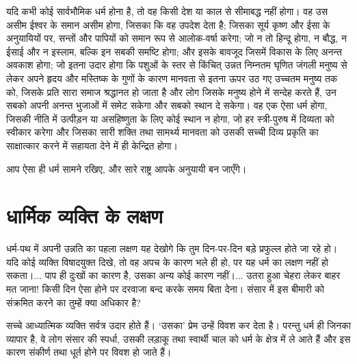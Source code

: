 \vskip 2pt

यदि कभी कोई सार्वभौमिक धर्म होना है, तो वह किसी देश या काल से सीमाबद्ध नहीं होगा। वह उस असीम ईश्वर के समान असीम होगा, जिसका कि वह उपदेश देता है; जिसका सूर्य कृष्ण और ईसा के अनुयायियों पर, सन्तों और पापियों को समान रूप से आलोक-वर्षा करेगा; जो न तो हिन्दू होगा, न बौद्ध, न ईसाई और न इस्लाम, बल्कि इन सबकी समष्टि होगा; और इसके बावजूद जिसमें विकास के लिए अनन्त अवकाश होगा; जो इतना उदार होगा कि पशुओं के स्तर से किंचित् उन्नत निम्नतम घृणित जंगली मनुष्य से लेकर अपने हृदय और मस्तिष्क के गुणों के कारण मानवता से इतना ऊपर उठ गए उच्चतम मनुष्य तक को, जिसके प्रति सारा समाज श्रद्धानत हो जाता है और लोग जिसके मनुष्य होने में सन्देह करते हैं, उन सबको अपनी अनन्त भुजाओं में समेट सकेगा और सबको स्थान दे सकेगा। वह एक ऐसा धर्म होगा, जिसकी नीति में उत्पीड़न या असहिष्णुता के लिए कोई स्थान न होगा, जो हर स्त्री-पुरुष में दिव्यता को स्वीकार करेगा और जिसका सारी शक्ति तथा सामर्थ्य मानवता को उसकी सच्ची दिव्य प्रकृति का साक्षात्कार करने में सहायता देने में ही केन्द्रित होगा। 

\vskip 2pt

आप ऐसा ही धर्म सामने रखिए, और सारे राष्ट्र आपके अनुयायी बन जाएँगे। 

\vskip 2pt


\section*{धार्मिक व्यक्ति के लक्षण}


धर्म-पथ में अपनी उन्नति का पहला लक्षण यह देखोगे कि तुम दिन-पर-दिन बड़े प्रफुल्ल होते जा रहे हो। यदि कोई व्यक्ति विषादयुक्त दिखे, तो वह अपच के कारण भले ही हो, पर यह धर्म का लक्षण नहीं हो सकता।... पाप ही दुःखों का कारण है, उसका अन्य कोई कारण नहीं।... उतरा हुआ चेहरा लेकर बाहर मत जाना! किसी दिन ऐसा होने पर दरवाजा बन्द करके समय बिता देना। संसार में इस बीमारी को संक्रमित करने का तुम्हें क्या अधिकार है? 

सच्चे आध्यात्मिक व्यक्ति सर्वत्र उदार होते हैं। ‘उसका’ प्रेम उन्हें विवश कर देता है। परन्तु धर्म ही जिनका व्यापार है, वे लोग संसार की स्पर्धा, उसकी लड़ाकू तथा स्वार्थी चाल को धर्म के क्षेत्र में ले आते हैं और इस कारण संकीर्ण तथा धूर्त होने पर विवश हो जाते हैं। 

